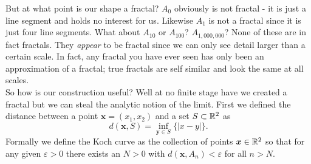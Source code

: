 But at what point is our shape a fractal? \(A_0\) obviously is not fractal - 
it is just a line segment and holds no interest for us. Likewise \(A_1\) is
not a fractal since it is just four line segments. What about \(A_{10}\) or
\(A_{100}\)? \(A_{1,000,000}\)? None of these are in fact fractals. They 
{\em appear} to be fractal since we can only see detail larger than a certain
scale. In fact, any fractal you have ever seen has only been an approximation
of a fractal; true fractals are self similar and look the same at all scales.\\

So how is our construction useful? Well at no finite stage have we created a
fractal but we can steal the analytic notion of the limit. First we defined the
distance between a point \(\bm{x} = (x_1,x_2)\) and a set \(S\subset \mathbb R^2\) as
\[d(\bm{x},S) = \inf_{\bm{y} \in S}{\{|x-y|\}}.\]
Formally we define the Koch curve as the collection of points \(\bm{x} \in
\mathbb R^2\) so that for any given \(\varepsilon > 0\) there exists an \(N > 0\) with
\(d(\bm{x},A_n) < \varepsilon\) for all \(n > N\). \\


